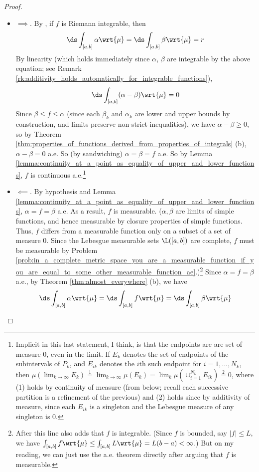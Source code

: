\documentclass{article} %
\newcommand{\dmu}{\wrt{\mu}}
\begin{document}
\begin{proof}
\begin{alphabate}
\item
\begin{itemize}
\item $\boxed{\implies}$.  By , if $f$ is Riemann integrable, then 
\[ \ds\int_{[a,b]} \alpha \dmu = \ds\int_{[a,b]} \beta \dmu = r\]
By linearity {\tiny (which holds immediately since $\alpha$, $\beta$ are integrable by the above equation; see Remark \ref{rk:additivity_holds_automatically_for_integrable_functions})}, 
\[  \ds\int_{[a,b]} (\alpha-\beta) \dmu =0  \]
Since $\beta \leq f \leq \alpha$ {\tiny (since each $\beta_k$ and $\alpha_k$ are lower and upper bounds by construction, and limits preserve non-strict inequalities)}, we have $\alpha-\beta \geq 0$, so by Theorem \ref{thm:properties_of_functions_derived_from_properties_of_integrals} (b), $\alpha-\beta =0$ a.e.  So {\tiny (by sandwiching)} $\alpha=\beta=f$ a.e.   So by Lemma \ref{lemma:continuity_at_a_point_as_equality_of_upper_and_lower_functions}, $f$ is continuous a.e.\footnote{Implicit in this last statement, I think, is that the endpoints are are set of measure 0, even in the limit.  If $E_k$ denotes the set of endpoints of the subintervals of $P_k$, and $E_{ik}$ denotes the $i$th such endpoint for $i=1,...,N_k$, then $\mu(\lim_{k \to \infty} E_k) \stackrel{1}{=} \lim_{k \to \infty} \mu(E_k) = \lim_k \mu(\cup_{i=1}^{N_k} E_{ik}) \stackrel{2}{=} 0$, where (1) holds by continuity of measure (from below; recall each successive partition is a refinement of the previous) and (2) holds since by additivity of measure, since each $E_{ik}$ is a singleton and the Lebesgue measure of any singleton is 0.
}
\item $\boxed{\impliedby}$.  By hypothesis and Lemma  \ref{lemma:continuity_at_a_point_as_equality_of_upper_and_lower_functions}, $\alpha = f = \beta$ a.e.   As a result, $f$ is measurable.   {\tiny ($\alpha, \beta$ are limits of simple functions, and hence measurable by closure properties of simple functions.  Thus, $f$ differs from a measurable function only on a subset of a set of measure 0.   Since the Lebesgue measurable sets $\L([a,b])$ are complete, $f$ must be measurable by Problem \ref{prob:in_a_complete_metric_space_you_are_a_measurable_function_if_you_are_equal_to_some_other_measurable_function_ae}.)}\footnote{After this line \cite{ash2000probability} also adds that $f$ is integrable. {\tiny (Since $f$ is bounded, say $|f| \leq L$, we have $\int_{[a,b]} f \dmu \leq \int_{[a,b]} L \dmu = L (b-a) < \infty $.) } But on my reading, we can just use the a.e. theorem directly after arguing that $f$ is measurable.} Since $\alpha=f=\beta$ a.e., by Theorem \ref{thm:almost_everywhere} (b),  we have
\begin{align}
\ds\int_{[a,b]} \alpha \dmu =  \ds\int_{[a,b]} f \dmu  = \ds\int_{[a,b]} \beta \dmu  
\label{eqn:lebesgue_integral_of_riemann_integral_fucntion_equals_the_lebesgue_integral_of_the_limits_of_the_upper_and_lower_functions}
\end{align}


\end{itemize}
\end{alphabate}
\end{proof}
\end{document}

